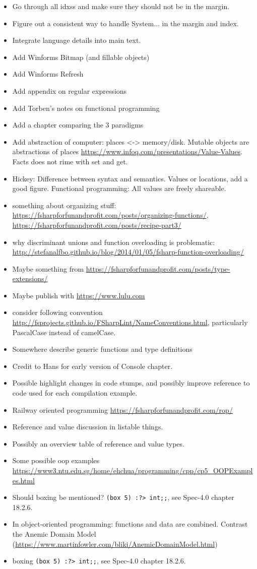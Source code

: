 \documentclass[fsharpNotes.tex]{subfiles}
\begin{document}
\begin{itemize}
\item Go through all idxss and make sure they should not be in the
  margin.
\item Figure out a consistent way to handle System... in the margin
  and index.
\item Integrate language details into main text.
\item Add Winforms Bitmap (and fillable objects)
\item Add Winforms Refresh
\item Add appendix on regular expressions
\item Add Torben's notes on functional programming
\item Add a chapter comparing the 3 paradigms
\item Add abstraction of computer: places <-> memory/disk. Mutable objects are abstractions of places \url{https://www.infoq.com/presentations/Value-Values}. Facts does not rime with set and get. 
\item Hickey: Difference between syntax and semantics. Values or locations, add a good figure. Functional programming: All values are freely shareable.
\item something about organizing stuff: \url{https://fsharpforfunandprofit.com/posts/organizing-functions/}, \url{https://fsharpforfunandprofit.com/posts/recipe-part3/}
\item why discriminant unions and function overloading is problematic: \url{http://stefanalfbo.github.io/blog/2014/01/05/fsharp-function-overloading/}
\item Maybe something from \url{https://fsharpforfunandprofit.com/posts/type-extensions/}
\item Maybe publish with \url{https://www.lulu.com}
\item consider following convention \url{http://fsprojects.github.io/FSharpLint/NameConventions.html},  particularly PascalCase instead of camelCase.
\item Somewhere describe generic functions and type definitions
\item Credit to Hans for early version of Console chapter.
\item Possible highlight changes in code stumps, and possibly improve reference to code used for each compilation example.
\item Railway oriented programming \url{https://fsharpforfunandprofit.com/rop/}
\item Reference and value discussion in listable things.
\item Possibly an overview table of reference and value types.
\item Some possible oop examples \url{https://www3.ntu.edu.sg/home/ehchua/programming/cpp/cp5_OOPExamples.html}
\item Should boxing be mentioned? \lstinline|(box 5) :?> int;;|, see Spec-4.0 chapter 18.2.6.
\item In object-oriented programming: functions and data are combined. Contrast the Anemic Domain Model (\url{https://www.martinfowler.com/bliki/AnemicDomainModel.html})
\item boxing \lstinline|(box 5) :?> int;;|, see Spec-4.0 chapter 18.2.6.
\end{itemize}
\end{document}

